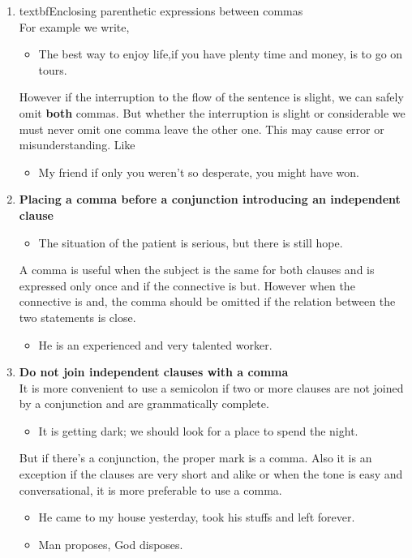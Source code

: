 \documentclass{report}
\begin{document}
\begin{enumerate}
\item textbf{Enclosing parenthetic expressions between commas}\\
For example we write,
\begin{itemize}
	\item The best way to enjoy life,if you have plenty time and money, is  to go on tours.
\end{itemize}
However if the interruption to the flow of the sentence is slight, we can safely omit \textbf{both} commas. But whether the interruption is slight or considerable we must never omit one comma leave the other one. This may cause error or misunderstanding. Like
\begin{itemize}
	\item My friend if only you weren't so desperate, you might have won.
\end{itemize}

\item \textbf{Placing a comma before a conjunction introducing an independent clause}\\
\begin{itemize}
	\item The situation of the patient is serious, but there is still hope.
\end{itemize}
A comma is useful when the subject is the same for both clauses and is expressed only once and if the connective is but. However when the connective is and, the comma should be omitted if the relation between the two statements is close.
\begin{itemize}
	\item He is an experienced and very talented worker.
\end{itemize}

\item \textbf{Do not join independent clauses with a comma}\\
It is more convenient to use a semicolon if two or more clauses are not joined by a conjunction and are grammatically complete. 
\begin{itemize}
	\item It is getting dark; we should look for a place to spend the night.
\end{itemize}
But if there's a conjunction, the proper mark is a comma. Also it is an exception if the clauses are very short and alike or when the tone is easy and conversational, it is more preferable to use a comma.
\begin{itemize}
	\item He came to my house yesterday, took his stuffs and left forever.
	\item Man proposes, God disposes.
\end{itemize}


\end{enumerate}
\end{document}
